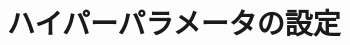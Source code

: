 \documentclass[../main.tex]{subfiles}
\begin{document}
\ifSubfilesClassLoaded{\setcounter{chapter}{7}}{}

\chapter{ハイパーパラメータの設定}
\end{document}
